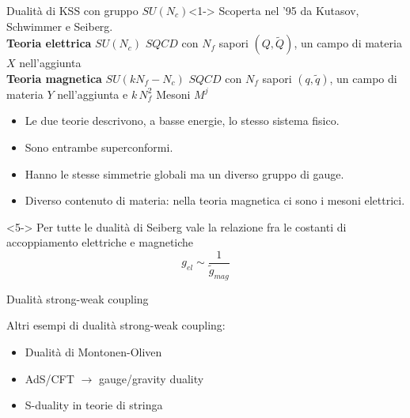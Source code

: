 \documentclass[10pt,compress]{beamer}
\begin{document}
\begin{frame}

\begin{block}{Dualità di KSS con gruppo $SU(N_c)$}<1->
Scoperta nel '95 da Kutasov, Schwimmer e Seiberg.\\
\vspace{0.3cm}
{\bfseries Teoria elettrica}  $SU(N_c)$  $SQCD$ con $N_f$  sapori $(Q,\tilde{Q})$, un campo di materia $X$ nell'aggiunta \\[0.2cm]
{\bfseries Teoria magnetica}  $SU(k N_f - N_c)$  $SQCD$ con $N_f$ sapori $(q,\tilde{q})$, un campo di materia $Y$ nell'aggiunta e  $ k \, N_f^2$  Mesoni $M^j$\\
\end{block}



	\begin{itemize}
\item<1->	Le due teorie descrivono, a basse energie, lo stesso sistema fisico.\\
\item<2->	Sono entrambe superconformi.
\item <3-> Hanno le stesse simmetrie globali ma un diverso gruppo di gauge.
\item <4->Diverso contenuto di materia: nella teoria magnetica ci sono i mesoni elettrici.
	\end{itemize}
\vspace{0.5cm}
\begin{block}{}<5->
Per tutte le dualità di Seiberg vale la relazione fra le costanti di accoppiamento elettriche e magnetiche
 $$
  g_{el} \sim \frac{1}{\tilde{g}_{mag}} 
$$
\end{block}


\end{frame}




\begin{frame}{Dualità strong-weak coupling}

\vspace{0.5cm}

Altri esempi di dualità strong-weak coupling:
\begin{itemize}
\item Dualità di Montonen-Oliven
\item AdS/CFT $\rightarrow$ gauge/gravity duality 
\item S-duality in teorie di stringa
\end{itemize}

\end{frame}
\end{document}
